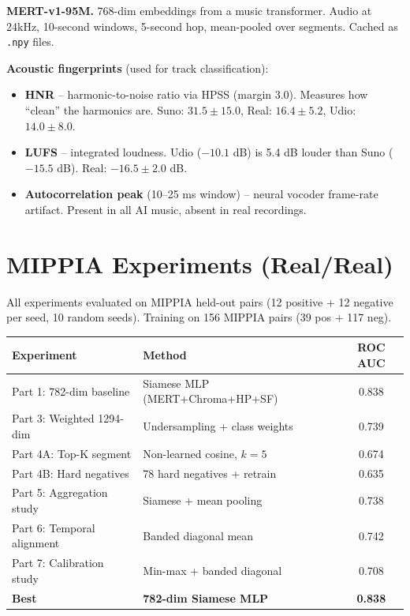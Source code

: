 \documentclass[10pt,a4paper]{article}
\begin{document}
\textbf{MERT-v1-95M.} 768-dim embeddings from a music transformer.
Audio at 24kHz, 10-second windows, 5-second hop, mean-pooled over segments.
Cached as \texttt{.npy} files.

\textbf{Acoustic fingerprints} (used for track classification):
\begin{itemize}[nosep]
  \item \textbf{HNR} -- harmonic-to-noise ratio via HPSS (margin 3.0).
    Measures how ``clean'' the harmonics are.
    Suno: $31.5 \pm 15.0$, Real: $16.4 \pm 5.2$, Udio: $14.0 \pm 8.0$.
  \item \textbf{LUFS} -- integrated loudness.
    Udio ($-10.1$ dB) is 5.4 dB louder than Suno ($-15.5$ dB).
    Real: $-16.5 \pm 2.0$ dB.
  \item \textbf{Autocorrelation peak} (10--25 ms window) --
    neural vocoder frame-rate artifact. Present in all AI music,
    absent in real recordings.
\end{itemize}

\section{MIPPIA Experiments (Real/Real)}

All experiments evaluated on MIPPIA held-out pairs (12 positive + 12 negative
per seed, 10 random seeds). Training on 156 MIPPIA pairs (39 pos + 117 neg).

\begin{center}
\begin{tabular}{llc}
\toprule
Experiment & Method & ROC AUC \\
\midrule
Part 1: 782-dim baseline & Siamese MLP (MERT+Chroma+HP+SF) & 0.838 \\
Part 3: Weighted 1294-dim & Undersampling + class weights & 0.739 \\
Part 4A: Top-K segment & Non-learned cosine, $k=5$ & 0.674 \\
Part 4B: Hard negatives & 78 hard negatives + retrain & 0.635 \\
Part 5: Aggregation study & Siamese + mean pooling & 0.738 \\
Part 6: Temporal alignment & Banded diagonal mean & 0.742 \\
Part 7: Calibration study & Min-max + banded diagonal & 0.708 \\
\midrule
\textbf{Best} & \textbf{782-dim Siamese MLP} & \textbf{0.838} \\
\bottomrule
\end{tabular}
\end{center}
\end{document}
